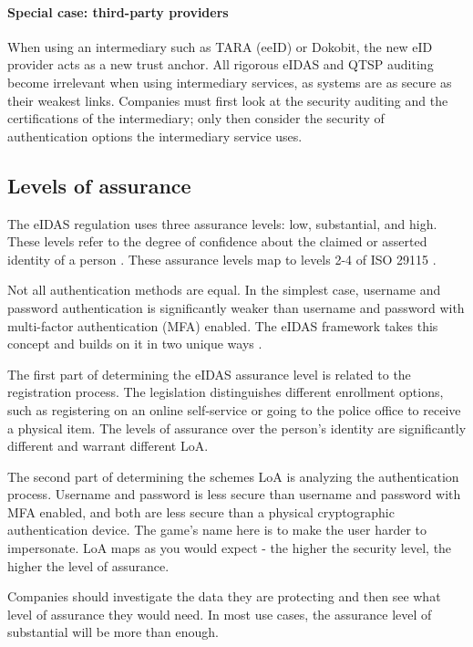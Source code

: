 \paragraph{Special case: third-party providers}

When using an intermediary such as TARA (eeID) or Dokobit, the new eID provider acts as a new trust anchor. All rigorous eIDAS and QTSP auditing become irrelevant when using intermediary services, as systems are as secure as their weakest links. Companies must first look at the security auditing and the certifications of the intermediary; only then consider the security of authentication options the intermediary service uses.

\subsection{Levels of assurance}

The eIDAS regulation uses three assurance levels: low, substantial, and high. These levels refer to the degree of confidence about the claimed or asserted identity of a person \cite{eulaw-eidas}. These assurance levels map to levels 2-4 of ISO 29115 \cite{iso29115}.

Not all authentication methods are equal. In the simplest case, {username and password} authentication is significantly weaker than {username and password} with multi-factor authentication (MFA) enabled. The eIDAS framework takes this concept and builds on it in two unique ways \cite{eulaw-eidas-loa}.

The first part of determining the eIDAS assurance level is related to the registration process. The legislation distinguishes different enrollment options, such as registering on an online self-service or going to the police office to receive a physical item. The levels of assurance over the person's identity are significantly different and warrant different LoA.

The second part of determining the schemes LoA is analyzing the authentication process. {Username and password} is less secure than {username and password} with MFA enabled, and both are less secure than a physical cryptographic authentication device. The game's name here is to make the user harder to impersonate. LoA maps as you would expect - the higher the security level, the higher the level of assurance.

Companies should investigate the data they are protecting and then see what level of assurance they would need. In most use cases, the assurance level of substantial will be more than enough.


